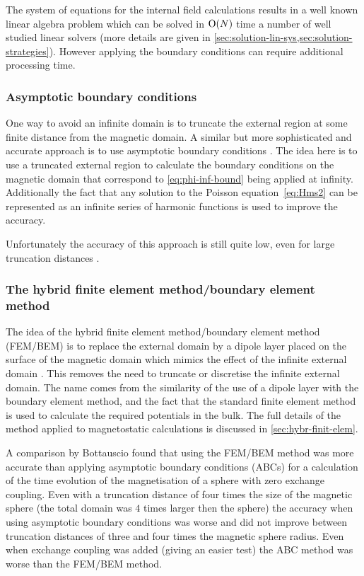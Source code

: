 The system of equations for the internal field calculations results in a well known linear algebra problem which can be solved in $\text{O}{\left( N \right)}$ time a number of well studied linear solvers (more details are given in \cref{sec:solution-lin-sys,sec:solution-strategies}).
However applying the boundary conditions can require additional processing time.



\subsubsection{Asymptotic boundary conditions}
\label{sec:asymptot-bcs}

One way to avoid an infinite domain is to truncate the external region at some finite distance from the magnetic domain.
A similar but more sophisticated and accurate approach is to use asymptotic boundary conditions \cite{Yang1997}.
The idea here is to use a truncated external region to calculate the boundary conditions on the magnetic domain that correspond to \cref{eq:phi-inf-bound} being applied at infinity.
Additionally the fact that any solution to the Poisson equation~\cref{eq:Hms2} can be represented as an infinite series of harmonic functions is used to improve the accuracy.

Unfortunately the accuracy of this approach is still quite low, even for large truncation distances \cite{Bottauscio2008}.


\subsubsection{The hybrid finite element method/boundary element method}
\label{sec:bound-elem-meth}

The idea of the hybrid finite element method/boundary element method (FEM/BEM) is to replace the external domain by a dipole layer placed on the surface of the magnetic domain which mimics the effect of the infinite external domain \cite{Fredkin1990}.
This removes the need to truncate or discretise the infinite external domain.
The name comes from the similarity of the use of a dipole layer with the boundary element method, and the fact that the standard finite element method is used to calculate the required potentials in the bulk.
The full details of the method applied to magnetostatic calculations is discussed in \cref{sec:hybr-finit-elem}.

A comparison by Bottauscio \cite{Bottauscio2008} found that using the FEM/BEM method was more accurate than applying asymptotic boundary conditions (ABCs) for a calculation of the time evolution of the magnetisation of a sphere with zero exchange coupling.
Even with a truncation distance of four times the size of the magnetic sphere (the total domain was $4$ times larger then the sphere) the accuracy when using asymptotic boundary conditions was worse and did not improve between truncation distances of three and four times the magnetic sphere radius.
Even when exchange coupling was added (giving an easier test) the ABC method was worse than the FEM/BEM method.

